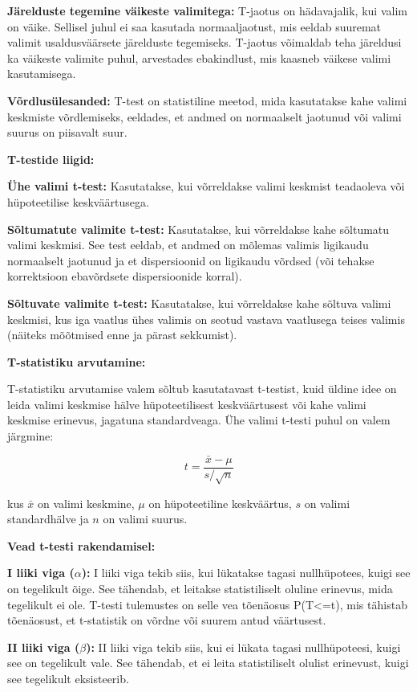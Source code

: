 \documentclass[
]{book}
\begin{document}
\textbf{Järelduste tegemine väikeste valimitega:} T-jaotus on hädavajalik, kui valim on väike. Sellisel juhul ei saa kasutada normaaljaotust, mis eeldab suuremat valimit usaldusväärsete järelduste tegemiseks. T-jaotus võimaldab teha järeldusi ka väikeste valimite puhul, arvestades ebakindlust, mis kaasneb väikese valimi kasutamisega.

\textbf{Võrdlusülesanded:} T-test on statistiline meetod, mida kasutatakse kahe valimi keskmiste võrdlemiseks, eeldades, et andmed on normaalselt jaotunud või valimi suurus on piisavalt suur.

\textbf{T-testide liigid:}

\textbf{Ühe valimi t-test:} Kasutatakse, kui võrreldakse valimi keskmist teadaoleva või hüpoteetilise keskväärtusega.

\textbf{Sõltumatute valimite t-test:} Kasutatakse, kui võrreldakse kahe sõltumatu valimi keskmisi. See test eeldab, et andmed on mõlemas valimis ligikaudu normaalselt jaotunud ja et dispersioonid on ligikaudu võrdsed (või tehakse korrektsioon ebavõrdsete dispersioonide korral).

\textbf{Sõltuvate valimite t-test:} Kasutatakse, kui võrreldakse kahe sõltuva valimi keskmisi, kus iga vaatlus ühes valimis on seotud vastava vaatlusega teises valimis (näiteks mõõtmised enne ja pärast sekkumist).

\textbf{T-statistiku arvutamine:}

T-statistiku arvutamise valem sõltub kasutatavast t-testist, kuid üldine idee on leida valimi keskmise hälve hüpoteetilisest keskväärtusest või kahe valimi keskmise erinevus, jagatuna standardveaga. Ühe valimi t-testi puhul on valem järgmine:

\[t = \frac{\bar{x} - \mu}{s / \sqrt{n}}\]

kus \(\bar{x}\) on valimi keskmine, \(\mu\) on hüpoteetiline keskväärtus, \(s\) on valimi standardhälve ja \(n\) on valimi suurus.

\textbf{Vead t-testi rakendamisel:}

\textbf{I liiki viga (\(\alpha\)):} I liiki viga tekib siis, kui lükatakse tagasi nullhüpotees, kuigi see on tegelikult õige. See tähendab, et leitakse statistiliselt oluline erinevus, mida tegelikult ei ole. T-testi tulemustes on selle vea tõenäosus P(T\textless=t), mis tähistab tõenäosust, et t-statistik on võrdne või suurem antud väärtusest.

\textbf{II liiki viga (\(\beta\)):} II liiki viga tekib siis, kui ei lükata tagasi nullhüpoteesi, kuigi see on tegelikult vale. See tähendab, et ei leita statistiliselt olulist erinevust, kuigi see tegelikult eksisteerib.
\end{document}
